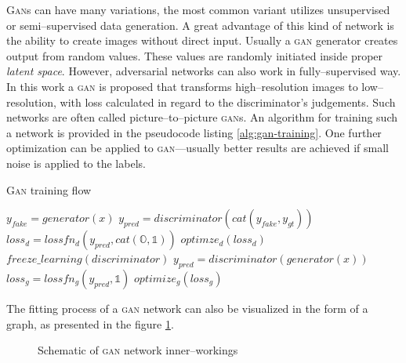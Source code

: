 \textsc{Gan}s can have many variations, the most common variant utilizes unsupervised or semi--supervised data generation.
A great advantage of this kind of network is the ability to create images without direct input.
Usually a \textsc{gan} generator creates output from random values.
These values are randomly initiated inside proper \textit{latent space}.
However, adversarial networks can also work in fully--supervised way.
In this work a \textsc{gan} is proposed that transforms high--resolution images to low--resolution, with loss calculated in regard to the discriminator's judgements.
Such networks are often called picture--to--picture \textsc{gan}s.
An algorithm for training such a network is provided in the pseudocode listing \ref{alg:gan-training}.
One further optimization can be applied to \textsc{gan}---usually better results are achieved if small noise is applied to the labels.
\begin{algorithm}
\caption{\textsc{Gan} training flow}
\label{alg:gan-training}
\begin{algorithmic}
	\STATE $ y_{fake} = generator(x) $
	\STATE $ y_{pred} = discriminator(cat(y_{fake}, y_{gt})) $
	\STATE $ loss_d = lossfn_d(y_{pred}, cat(\mathds{O}, \mathds{1})) $
	\STATE $ optimze_d(loss_d) $
	\STATE $ freeze\_learning(discriminator) $
	\STATE $ y_{pred} = discriminator(generator(x)) $
	\STATE $ loss_g = lossfn_g(y_{pred}, \mathds{1}) $
	\STATE $ optimize_g(loss_g) $
\end{algorithmic}
\end{algorithm}
The fitting process of a \textsc{gan} network can also be visualized in the form of a graph, as presented in the figure \ref{fig:gan-training}.
\begin{figure}
    \centering
    
    \caption{Schematic of \textsc{gan} network inner--workings}
    \label{fig:gan-training}
\end{figure}

